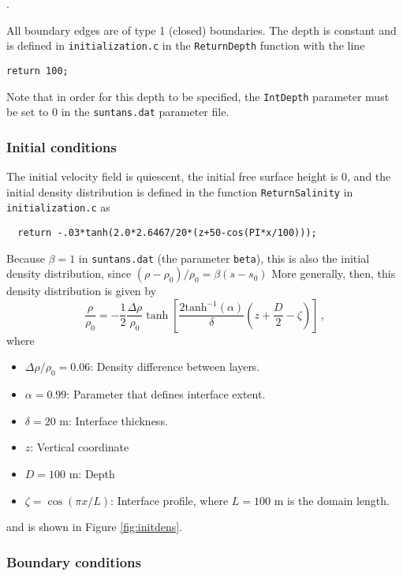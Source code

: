\medskip
\noindent
\mfiledownload.

\medskip
\noindent
All boundary edges are of type 1 (closed) boundaries.
The depth is constant and is defined in \verb+initialization.c+ in the 
\verb+ReturnDepth+ function with the line
\begin{verbatim}
return 100;
\end{verbatim}
Note that in order for this depth to be specified, the \verb+IntDepth+ parameter must
be set to 0 in the \verb+suntans.dat+ parameter file.

\subsubsection{Initial conditions}

The initial velocity field is quiescent, the initial free surface height is 0,
and the initial density distribution is defined in the function \verb+ReturnSalinity+
in \verb+initialization.c+ as
\begin{verbatim}
  return -.03*tanh(2.0*2.6467/20*(z+50-cos(PI*x/100)));
\end{verbatim}
Because $\beta=1$ in \verb+suntans.dat+ (the parameter \verb+beta+), this is also the initial density 
distribution, since $(\rho-\rho_0)/\rho_0 = \beta(s-s_0)$ More generally, then, 
this density distribution is given by
\[
\frac{\rho}{\rho_0} = -\frac{1}{2}\frac{\Delta\rho}{\rho_0}
\tanh\left[\frac{2\mbox{tanh}^{-1}(\alpha)}{\delta}\left(z+\frac{D}{2}-\zeta\right)\right]\,,
\]
where
\begin{itemize}
\item $\Delta\rho/\rho_0=0.06$: Density difference between layers.
\item $\alpha=0.99$: Parameter that defines interface extent.
\item $\delta=20$ m: Interface thickness.
\item $z$: Vertical coordinate
\item $D=100$ m: Depth
\item $\zeta = \cos(\pi x/L)$: Interface profile, where $L=100$ m is the domain length.
\end{itemize}
and is shown in Figure \ref{fig:initdens}. 

\subsubsection{Boundary conditions}

